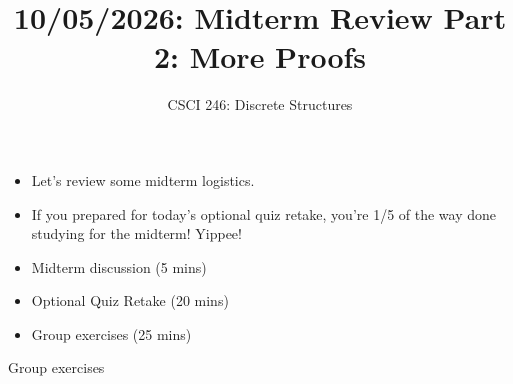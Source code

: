 \documentclass[10pt]{beamer}
\begin{document}






\title{10/05/2026: Midterm Review Part 2: More Proofs}
\author{CSCI 246: Discrete Structures}

\begin{frame}
    \titlepage 
\end{frame}


\begin{frame}

\begin{myredbox}[title=Announcements]
\begin{itemize}
	\item Let's review some midterm logistics.
	\item If you prepared for today's optional quiz retake, you're 1/5 of the way done studying for the midterm!  Yippee!
\end{itemize}
\end{myredbox}
\vfill 


\begin{myyellowbox}[title=Today's Agenda]
\begin{itemize}	
	
	\item Midterm discussion (5 mins)
	\item Optional Quiz Retake (20 mins)
	\item Group exercises (25 mins)
\end{itemize}

%	
\end{myyellowbox}
\vfill 

\end{frame}



\begin{frame}[standout]
Group exercises
\end{frame}
\end{document}
